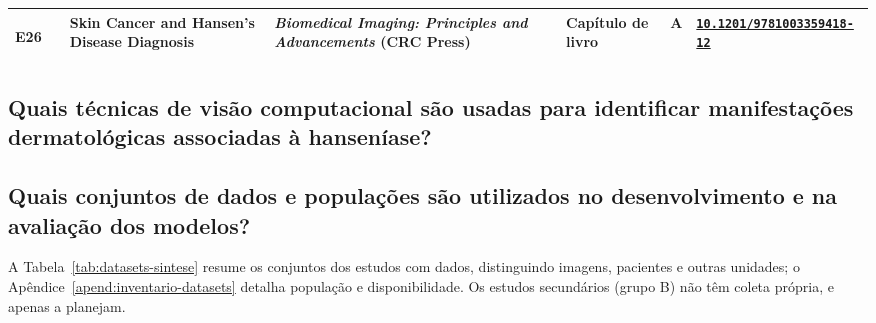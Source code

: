 \begin{longtable}{|l|>{\raggedright\arraybackslash}p{2.4cm}|>{\raggedright\arraybackslash}p{5.0cm}|>{\raggedright\arraybackslash}p{2.6cm}|l|l|>{\raggedright\arraybackslash}p{2.5cm}|}
	\hypertarget{estudo:E26}{}E26 & \citeonline{lima2024skin} & Skin Cancer and Hansen's Disease Diagnosis & \textit{Biomedical Imaging: Principles and Advancements} (CRC Press) & Capítulo de livro & A & \href{https://doi.org/10.1201/9781003359418-12}{\nolinkurl{10.1201/9781003359418-12}} \\ \hline
\end{longtable}
\endgroup
{}

\subsection{Quais técnicas de visão computacional são usadas para identificar manifestações dermatológicas associadas à hanseníase?}
\label{subsec:rq1-tecnicas}



\subsection{Quais conjuntos de dados e populações são utilizados no desenvolvimento e na avaliação dos modelos?}
\label{subsec:rq2-datasets}

A Tabela~\ref{tab:datasets-sintese} resume os conjuntos dos estudos com
dados, distinguindo imagens, pacientes e outras unidades; o
Apêndice~\ref{apend:inventario-datasets} detalha população e
disponibilidade. Os estudos secundários (grupo B) não têm coleta própria, e
 apenas a planejam.

